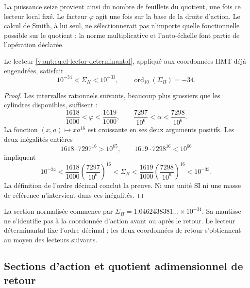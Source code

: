 La puissance seize provient ainsi du nombre de feuillets du quotient, une
fois ce lecteur local fixé. Le facteur \(\varphi\) agit une fois sur
la base de la droite d'action. Le calcul de Smith, à lui seul, ne
sélectionnerait pas n'importe quelle fonctionnelle possible sur le quotient : la norme
multiplicative et l'auto-échelle font partie de l'opération déclarée.

\begin{theorem}
Le lecteur \eqref{v:ant:eq:el-lector-determinantal}, appliqué aux coordonnées
HMT déjà engendrées, satisfait
\begin{equation}
 10^{-34}<\Sigma_H<10^{-33},\qquad
 \operatorname{ord}_{10}(\Sigma_H)=-34.
 \label{v:ant:eq:el-decada}
\end{equation}
\end{theorem}
\begin{proof}
Les intervalles rationnels suivants, beaucoup plus grossiers que les cylindres
disponibles, suffisent :
\[
 \frac{1618}{1000}<\varphi<\frac{1619}{1000},\qquad
 \frac{7297}{10^6}<\alpha<\frac{7298}{10^6}.
\]
La fonction \((x,a)\mapsto xa^{16}\) est croissante en ses deux arguments
positifs. Les deux inégalités entières
\[
 1618\cdot7297^{16}>10^{65},\qquad
 1619\cdot7298^{16}<10^{66}
\]
impliquent
\[
 10^{-34}
 <\frac{1618}{1000}\left(\frac{7297}{10^6}\right)^{16}
 <\Sigma_H
 <\frac{1619}{1000}\left(\frac{7298}{10^6}\right)^{16}
 <10^{-33}.
\]
La définition de l'ordre décimal conclut la preuve. Ni une
unité SI ni une masse de référence n'intervient dans ces inégalités.
\end{proof}

La section normalisée commence par
\(\Sigma_H=1.0462438381\ldots\times10^{-34}\). Sa mantisse ne
s'identifie pas à la coordonnée d'action avant ou après le retour.
Le lecteur déterminantal fixe l'ordre décimal ; les deux coordonnées de
retour s'obtiennent au moyen des lecteurs suivants.


\subsection{Sections d'action et quotient adimensionnel de retour}

